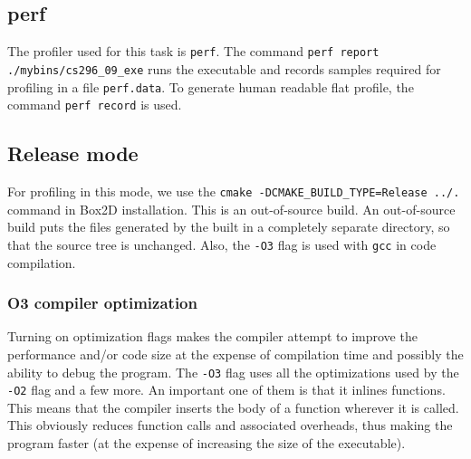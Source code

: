 \documentclass[11pt,english]{article}
\begin{document}
\subsection{perf}
\indent
\par{The profiler used for this task is \verb+perf+. The command \verb+perf report ./mybins/cs296_09_exe+ runs the executable and records samples required for profiling in a file \verb+perf.data+. To generate human readable flat profile, the command \verb+perf record+ is used.}
\subsection{Release mode}
\indent 
\par{For profiling in this mode, we use the \verb+cmake -DCMAKE_BUILD_TYPE=Release ../.+ command in Box2D installation. This is an out-of-source build.  An out-of-source build puts the files generated by the built in a completely separate directory, so that the source tree is unchanged. Also, the \verb+-O3+ flag is used with \verb+gcc+ in code compilation.}
\subsubsection{O3 compiler optimization}
\indent 
\par{Turning on optimization flags makes the compiler attempt to improve the performance and/or code size at the expense of compilation time and possibly the ability to debug the program. The \verb+-O3+ flag uses all the optimizations used by the \verb+-O2+ flag and a few more. An important one of them is that it inlines functions. This means that the compiler inserts the body of a function wherever it is called. This obviously reduces function calls and associated overheads, thus making the program faster (at the expense of increasing the size of the executable). }
\end{document}
